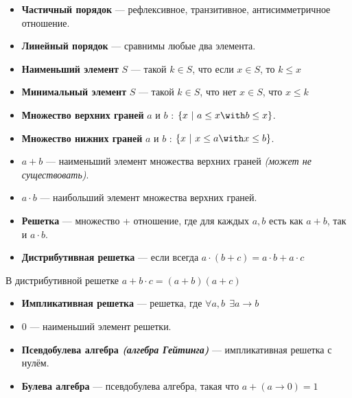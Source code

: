 \documentclass[12pt, a4paper, oneside]{book}
\begin{document}
\begin{definition}\itemfix
    \begin{itemize}
        \item \textbf{Частичный порядок} --- рефлексивное, транзитивное, антисимметричное отношение.
        \item \textbf{Линейный порядок} --- сравнимы любые два элемента.
        \item \textbf{Наименьший элемент} \(S\) --- такой \(k\in S\), что если \(x\in S\), то \(k \leq x\)
        \item \textbf{Минимальный элемент} \(S\) --- такой \(k\in S\), что нет \(x\in S\), что \(x \leq k\)
        \item \textbf{Множество верхних граней} \(a\) и \(b\) : \(\{x\ |\ a \leq x \with b \leq x\}\).
        \item \textbf{Множество нижних граней} \(a\) и \(b\) : \(\{x\ |\ x \leq a \with x \leq b\}\).
        \item \(a + b\) --- наименьший элемент множества верхних граней \textit{(может не существовать)}.
        \item \(a \cdot b\) --- наибольший элемент множества верхних граней.
        \item \textbf{Решетка} --- множество + отношение, где для каждых \(a,b\) есть как \(a + b\), так и \(a \cdot b\).
        \item \textbf{Дистрибутивная решетка} --- если всегда \(a\cdot(b + c) = a\cdot b + a\cdot c\)
    \end{itemize}
\end{definition}

\begin{lemma}
    В дистрибутивной решетке \(a + b\cdot c = (a + b)(a + c)\)
\end{lemma}

\begin{definition}\itemfix
    \begin{itemize}
        \item \textbf{Импликативная решетка} --- решетка, где \(\forall a, b \ \ \exists a \to b\)
        \item \(0\) --- наименьший элемент решетки.
        \item \textbf{Псевдобулева алгебра \textit{(алгебра Гейтинга)}} --- импликативная решетка с нулём.
        \item \textbf{Булева алгебра} --- псевдобулева алгебра, такая что \(a + (a \to 0) = 1\)
    \end{itemize}
\end{definition}
\end{document}

